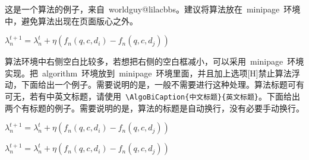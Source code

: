 
这是一个算法的例子，来自~worldguy@lilacbbs。建议将算法放在~minipage~环境中，避免算法出现在页面版心之外。

\begin{algorithm}
%

{   
    $\lambda^{t+1}_n = \lambda^t_n + \eta (f_n(q, c, d_i) - f_n(q, c, d_j))$
 }
\end{algorithm}

%

算法环境中右侧空白比较多，若想把右侧的空白框减小，可以采用~minipage~环境实现。把~algorithm~环境放到~minipage~环境里面，并且加上选项[H]禁止算法浮动，下面给出一个例子。需要说明的是，一般不需要进行这种处理。算法标题可有可无，若有中英文标题，请使用~\verb|\AlgoBiCaption{中文标题}{英文标题}|。下面给出两个有标题的例子。需要说明的是，算法的标题是自动换行，没有必要手动换行。

\begin{minipage}{0.8\textwidth}\centering
\begin{algorithm}[H]
  { $\lambda^{t+1}_n = \lambda^t_n +
    \eta (f_n(q, c, d_i) - f_n(q, c, d_j))$ }
\end{algorithm}
\end{minipage}


\begin{minipage}{0.9\textwidth}\centering
\begin{algorithm}[H]
  { $\lambda^{t+1}_n = \lambda^t_n +
    \eta (f_n(q, c, d_i) - f_n(q, c, d_j))$ }
\end{algorithm}
\end{minipage}

